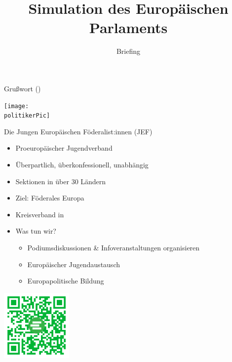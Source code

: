 \documentclass{beamer}
\title{Simulation des Europäischen Parlaments}
\subtitle{Briefing}
\begin{document}
\frame{\titlepage}

\begin{frame}{Grußwort \politiker \newline (\politikerOffice)}
\vspace{-1cm}
    \begin{center}
        \texttt{[image: \\politikerPic]}
    \end{center}
\end{frame}

\begin{frame}{Die Jungen Europäischen Föderalist:innen (JEF)}
    \begin{minipage}[t]{0.7\textwidth}
    \vspace{-3.5cm}
        \begin{itemize}
            \item Proeuropäischer Jugendverband
            \item Überpartlich, überkonfessionell, unabhängig
            \item Sektionen in über 30 Ländern
            \item Ziel: Föderales Europa
            \item Kreisverband in \city
            \newline
            \item Was tun wir?
            \begin{itemize}
                \item Podiumsdiskussionen \& Infoveranstaltungen organisieren
                \item Europäischer Jugendaustausch
                \item Europapolitische Bildung
            \end{itemize}
        \end{itemize}
    \end{minipage}%
    \begin{minipage}[t]{0.25\textwidth}
        \includegraphics[height=3.5cm]{Bilder/mitmachen.png}
    \end{minipage}
\end{frame}
\end{document}
